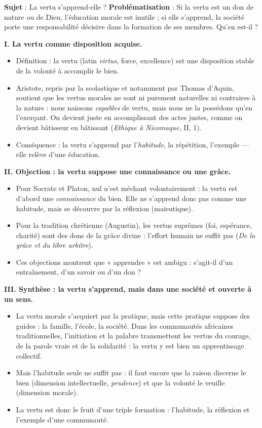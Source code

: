 \documentclass[11pt]{article}
\newcommand{\cle}[1]{{\popxbold\color{popdark}#1}}
\begin{document}
\begin{exoresolu}
\textbf{Sujet} : La vertu s'apprend-elle ?
\tcblower
\textbf{Problématisation} : Si la vertu est un don de nature ou de Dieu, l'éducation morale est inutile ; si elle s'apprend, la société porte une responsabilité décisive dans la formation de ses membres. Qu'en est-il ?

\textbf{I. La vertu comme disposition acquise.}
\begin{itemize}
\item Définition : la \cle{vertu} (latin \emph{virtus}, force, excellence) est une disposition stable de la volonté à accomplir le bien.
\item Aristote, repris par la scolastique et notamment par Thomas d'Aquin, soutient que les vertus morales ne sont ni purement naturelles ni contraires à la nature : nous naissons \emph{capables} de vertu, mais nous ne la possédons qu'en l'exerçant. On devient juste en accomplissant des actes justes, comme on devient bâtisseur en bâtissant (\emph{Ethique à Nicomaque}, II, 1).
\item Conséquence : la vertu s'apprend par l'\emph{habitude}, la répétition, l'exemple — elle relève d'une éducation.
\end{itemize}

\textbf{II. Objection : la vertu suppose une connaissance ou une grâce.}
\begin{itemize}
\item Pour Socrate et Platon, nul n'est méchant volontairement : la vertu est d'abord une \emph{connaissance} du bien. Elle ne s'apprend donc pas comme une habitude, mais se découvre par la réflexion (maïeutique).
\item Pour la tradition chrétienne (Augustin), les vertus suprêmes (foi, espérance, charité) sont des dons de la grâce divine : l'effort humain ne suffit pas (\emph{De la grâce et du libre arbitre}).
\item Ces objections montrent que « apprendre » est ambigu : s'agit-il d'un entraînement, d'un savoir ou d'un don ?
\end{itemize}

\textbf{III. Synthèse : la vertu s'apprend, mais dans une société et ouverte à un sens.}
\begin{itemize}
\item La vertu morale s'acquiert par la pratique, mais cette pratique suppose des guides : la famille, l'école, la \cle{société}. Dans les communautés africaines traditionnelles, l'initiation et la palabre transmettent les vertus du courage, de la parole vraie et de la solidarité : la vertu y est bien un apprentissage collectif.
\item Mais l'habitude seule ne suffit pas : il faut encore que la raison discerne le bien (dimension intellectuelle, \emph{prudence}) et que la volonté le veuille (dimension morale).
\item La vertu est donc le fruit d'une triple formation : l'habitude, la réflexion et l'exemple d'une communauté.
\end{itemize}


\end{exoresolu}
\end{document}
